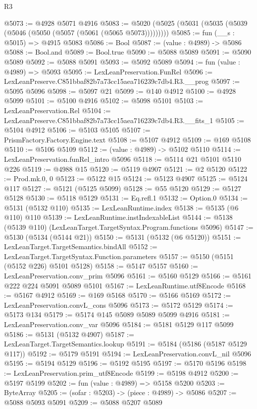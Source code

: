 \begin{lexlean}{R3}
\begin{coremodule}
@5073 := @4928 @5071 @4916
@5083 := @5020 (@5025 (@5031 (@5035 (@5039 (@5046 (@5050 (@5057 (@5061 (@5065 @5073)))))))))
@5085 := fun (__s : @5015) => @4915 @5083
@5086 := Bool
@5087 := (value : @4989) -> @5086
@5088 := Bool.and
@5089 := Bool.true
@5090 := @5088 @5089
@5091 := @5090 @5089
@5092 := @5088 @5091
@5093 := @5092 @5089
@5094 := fun (value : @4989) => @5093
@5095 := LexLeanPreservation.FunRel
@5096 := LexLeanPreserve.C851bbaf82b7a73cc15aea716239c7db4.R3.__prog
@5097 := @5095 @5096
@5098 := @5097 @21
@5099 := @140 @4912
@5100 := @4928 @5099
@5101 := @5100 @4916
@5102 := @5098 @5101
@5103 := LexLeanPreservation.Rel
@5104 := LexLeanPreserve.C851bbaf82b7a73cc15aea716239c7db4.R3.__fits_1
@5105 := @5104 @4912
@5106 := @5103 @5105
@5107 := PrismFactory.Factory.Engine.text
@5108 := @5107 @4912
@5109 := @169 @5108
@5110 := @5106 @5109
@5112 := (value : @4989) -> @5102 @5110
@5114 := LexLeanPreservation.funRel_intro @5096
@5118 := @5114 @21 @5101 @5110 @226
@5119 := @4988 @15
@5120 := @5119 @4907
@5121 := @2 @5120
@5122 := Prod.mk.{0, 0}
@5123 := @5122 @15
@5124 := @5123 @4907
@5125 := @5124 @117
@5127 := @5121 (@5125 @5099)
@5128 := @55 @5120
@5129 := @5127 @5128
@5130 := @5118 @5129
@5131 := Eq.refl.{1}
@5132 := Option.{0}
@5134 := @5131 (@5132 @110)
@5135 := LexLeanRuntime.index
@5138 := @5135 (@6 @110) @110
@5139 := LexLeanRuntime.instIndexableList
@5144 := @5138 (@5139 @110) (LexLeanTarget.TargetSyntax.Program.functions @5096)
@5147 := @5130 (@5134 (@5144 @21))
@5150 := @5131 (@5132 (@6 @5120))
@5151 := LexLeanTarget.TargetSemantics.bindAll
@5152 := LexLeanTarget.TargetSyntax.Function.parameters
@5157 := @5150 (@5151 (@5152 @226) @5101 @5128)
@5158 := @5147 @5157
@5160 := LexLeanPreservation.conv_prim @5096
@5161 := @5160 @5129
@5166 := @5161 @222 @224 @5091 @5089 @5101
@5167 := LexLeanRuntime.utf8Encode
@5168 := @5167 @4912
@5169 := @169 @5168
@5170 := @5166 @5169
@5172 := LexLeanPreservation.convL_cons @5096
@5173 := @5172 @5129
@5174 := @5173 @134
@5179 := @5174 @145 @5089 @5089 @5099 @4916
@5181 := LexLeanPreservation.conv_var @5096
@5184 := @5181 @5129 @117 @5099
@5186 := @5131 (@5132 @4907)
@5187 := LexLeanTarget.TargetSemantics.lookup
@5191 := @5184 (@5186 (@5187 @5129 @117))
@5192 := @5179 @5191
@5194 := LexLeanPreservation.convL_nil @5096
@5195 := @5194 @5129
@5196 := @5192 @5195
@5197 := @5170 @5196
@5198 := LexLeanPreservation.prim_utf8Encode
@5199 := @5198 @4912
@5200 := @5197 @5199
@5202 := fun (value : @4989) => @5158 @5200
@5203 := ByteArray
@5205 := (sofar : @5203) -> (piece : @4989) -> @5086
@5207 := @5088 @5093 @5091
@5209 := @5088 @5207 @5089

\end{coremodule}
\end{lexlean}
